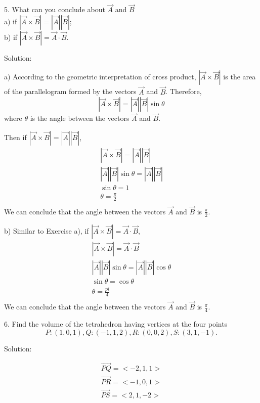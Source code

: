 \documentclass{article}
\begin{document}
5. What can you conclude about $\vec{A}$ and $\vec{B}$\\
a) if $|\vec{A} \times \vec{B}| = |\vec{A}| |\vec{B}|$;\\
b) if $|\vec{A} \times \vec{B}| = \vec{A} \cdot \vec{B}$.

Solution:

a) According to the geometric interpretation of cross product, 
$|\vec{A} \times \vec{B}|$ is the area of the parallelogram formed by the 
vectors $\vec{A}$ and $\vec{B}$. Therefore,
\[
  |\vec{A} \times \vec{B}| = |\vec{A}| |\vec{B}| \sin\theta
\]
where $\theta$ is the angle between the vectors $\vec{A}$ and $\vec{B}$.

Then if $|\vec{A} \times \vec{B}| = |\vec{A}| |\vec{B}|$,
\begin{gather*}
  |\vec{A} \times \vec{B}| = |\vec{A}| |\vec{B}| \\
  |\vec{A}| |\vec{B}| \sin\theta = |\vec{A}| |\vec{B}| \\
  \sin\theta = 1 \\
  \theta = \frac{\pi}{2} \\
\end{gather*}
We can conclude that the angle between the vectors $\vec{A}$ and $\vec{B}$ is 
$\frac{\pi}{2}$.

b) Similar to Exercise a), if 
$|\vec{A} \times \vec{B}| = \vec{A} \cdot \vec{B}$,
\begin{gather*}
  |\vec{A} \times \vec{B}| = \vec{A} \cdot \vec{B} \\
  |\vec{A}| |\vec{B}| \sin\theta = |\vec{A}| |\vec{B}| \cos\theta \\
  \sin\theta = \cos\theta \\
  \theta = \frac{pi}{4} \\
\end{gather*}
We can conclude that the angle between the vectors $\vec{A}$ and $\vec{B}$ is 
$\frac{\pi}{4}$.

6. Find the volume of the tetrahedron having vertices at the four points
\[ P:(1,0,1), Q:(-1,1,2), R:(0,0,2), S:(3,1,-1).\]

Solution:

\begin{gather*}
  \vec{PQ} = <-2, 1, 1> \\
  \vec{PR} = <-1, 0, 1> \\
  \vec{PS} = <2, 1, -2> \\
\end{gather*}
\end{document}

